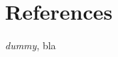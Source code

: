 \section{References} %
\label{sec:references}

\begin{thebibliography}{1}

  \emph{dummy},
  bla

\end{thebibliography}